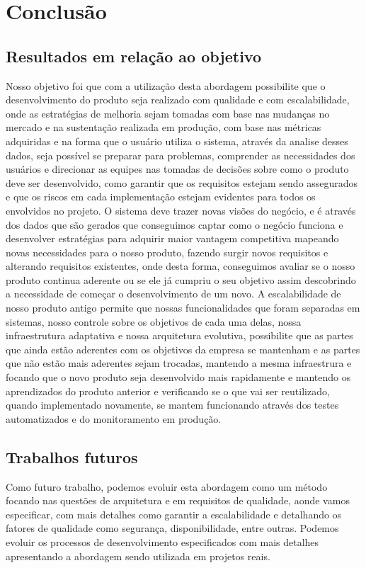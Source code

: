 \part{Conclusão}
  \chapter{Resultados em relação ao objetivo}
    Nosso objetivo foi que com a utilização desta abordagem possibilite que o
    desenvolvimento do produto seja realizado com qualidade e com escalabilidade,
    onde as estratégias de melhoria sejam tomadas com base nas mudanças no mercado
    e na sustentação realizada em produção, com base nas métricas adquiridas e na
    forma que o usuário utiliza o sistema, através da analise desses dados, seja
    possível se preparar para problemas, comprender as necessidades dos usuários
    e direcionar as equipes nas tomadas de decisões sobre como o produto deve ser
    desenvolvido, como garantir que os requisitos estejam sendo assegurados e que
    os riscos em cada implementação estejam evidentes para todos os envolvidos no
    projeto.\newline
    O sistema deve trazer novas visões do negócio, e é através dos dados que são
    gerados que conseguimos captar como o negócio funciona e desenvolver estratégias
    para adquirir maior vantagem competitiva mapeando novas necessidades para o
    nosso produto, fazendo surgir novos requisitos e alterando requisitos
    existentes, onde desta forma, conseguimos avaliar se o nosso produto continua
    aderente ou se ele já cumpriu o seu objetivo assim descobrindo a necessidade
    de começar o desenvolvimento de um novo. \newline
    A escalabilidade de nosso produto antigo permite que nossas funcionalidades
    que foram separadas em sistemas, nosso controle sobre os objetivos de cada
    uma delas, nossa infraestrutura adaptativa e nossa arquitetura evolutiva,
    possibilite que as partes que ainda estão aderentes com os objetivos da empresa
    se mantenham e as partes que não estão mais aderentes sejam trocadas, mantendo
    a mesma infraestrura e focando que o novo produto seja desenvolvido mais
    rapidamente e mantendo os aprendizados do produto anterior e verificando se
    o que vai ser reutilizado, quando implementado novamente, se mantem funcionando
    através dos testes automatizados e do monitoramento em produção.

  \chapter{Trabalhos futuros}
    Como futuro trabalho, podemos evoluir esta abordagem como um método focando
    nas questões de arquitetura e em requisitos de qualidade, aonde vamos especificar,
    com mais detalhes como garantir a escalabilidade e detalhando os fatores de
    qualidade como segurança, disponibilidade, entre outras. Podemos evoluir os
    processos de desenvolvimento especificados com mais detalhes apresentando a
    abordagem sendo utilizada em projetos reais.
